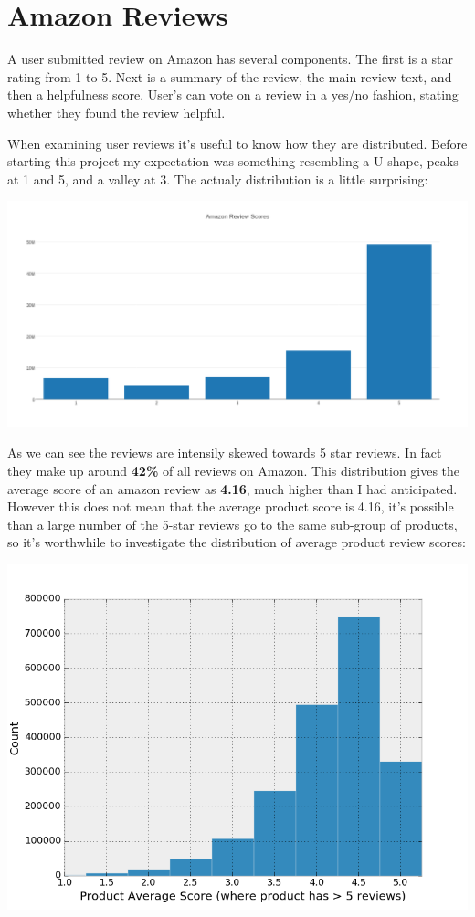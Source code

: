 \documentclass[a4paper,10pt]{article}
\begin{document}
\section*{Amazon Reviews}
A user submitted review on Amazon has several components. The first is a star rating from 1 to 5. Next is a summary of the review, the main review text, and then a helpfulness score. User's can vote on a review in a yes/no fashion, stating whether they found the review helpful.

When examining user reviews it's useful to know how they are distributed. Before starting this project my expectation was something resembling a U shape, peaks at 1 and 5, and a valley at 3. The actualy distribution is a little surprising:

\begin{center}
    \includegraphics[scale=0.60]{score_histogram.png}
\end{center}

As we can see the reviews are intensily skewed towards 5 star reviews. In fact they make up around \textbf{42\%} of all reviews on Amazon. This distribution gives the average score of an amazon review as \textbf{4.16}, much higher than I had anticipated. However this does not mean that the average product score is 4.16, it's possible than a large number of the 5-star reviews go to the same sub-group of products, so it's worthwhile to investigate the distribution of average product review scores:

\begin{center}
    \includegraphics[scale=0.65]{starbins_gt_5.png}
\end{center}
\end{document}
